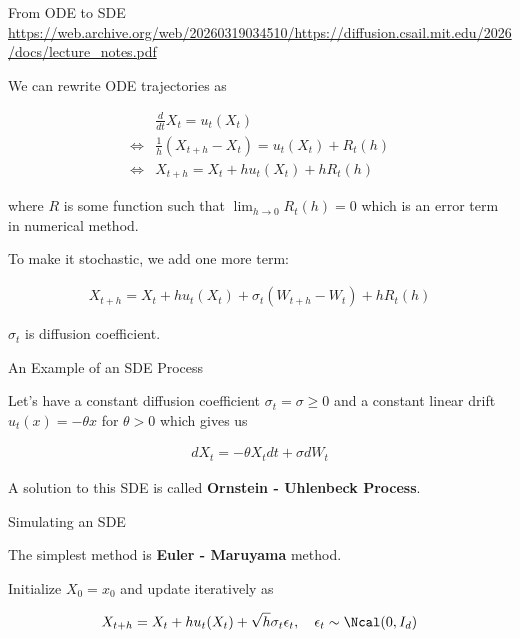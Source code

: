 \documentclass[aspectratio=169,xcolor=dvipsnames,svgnames,x11names,fleqn]{beamer}
\begin{document}
\begin{frame}{From ODE to SDE}
{\scriptsize \url{https://web.archive.org/web/20260319034510/https://diffusion.csail.mit.edu/2026/docs/lecture_notes.pdf}}

\vspace{5pt}

We can rewrite ODE trajectories as 

\begin{align*}
    & \frac{d}{dt} X_t = u_t(X_t)\\
    \Leftrightarrow & \frac{1}{h} (X_{t+h}  - X_t) = u_t(X_t)  + R_t(h)\\
    \Leftrightarrow & X_{t+h} = X_t + h u_t (X_t) + h R_t(h)
\end{align*}

where $R$ is some function such that $\lim_{h \to 0} R_t(h) = 0$ which is an error term in numerical method.

To make it stochastic, we add one more term:

\begin{align*}
    X_{t+h} = X_t + hu_t(X_t) + \sigma_t(W_{t+h} - W_t) + h R_t(h)
\end{align*}

$\sigma_t$ is diffusion coefficient.

    
\end{frame}

\begin{frame}{An Example of an SDE Process}

Let's have a constant diffusion coefficient $\sigma_t = \sigma \geq 0 $ and  a constant linear drift $u_t(x ) = -\theta x$ for $\theta > 0$ which gives us

\begin{align*}
    dX_t = - \theta X_t dt + \sigma dW_t
\end{align*}

A solution to this SDE is called \textbf{ Ornstein - Uhlenbeck Process}.
    
\end{frame}

\begin{frame}{Simulating an SDE}

    The simplest method is \textbf{Euler - Maruyama} method.

    \vspace{5pt}

    Initialize $X_0 = x_0$ and update iteratively as 

    $$
    X_{t+h} = X_t + h u_t(X_t) + \sqrt{h}\sigma_t \epsilon_t, \quad \epsilon_t \sim \Ncal(0, I_d)
    $$
    
\end{frame}
\end{document}
